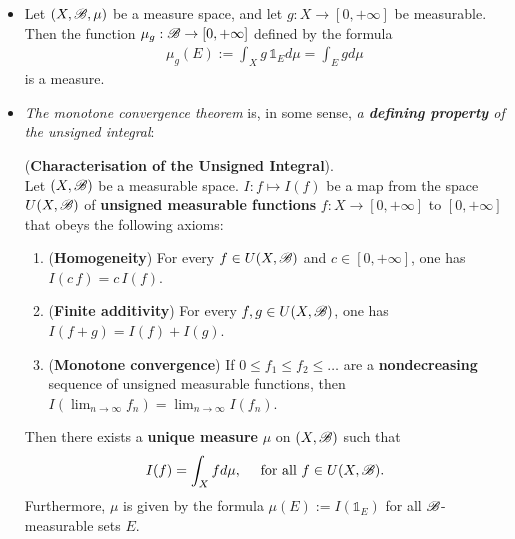 \documentclass[11pt]{article}
\begin{document}
\begin{itemize}
\item \begin{proposition} 
Let $(X, {\mathscr B}, \mu)$ be a measure space, and let $g: X \rightarrow [0, +\infty]$ be measurable. Then the function $\mu_g : {\mathscr B} \rightarrow [0, +\infty]$ defined by the formula
\begin{align*}
\mu_g(E) := \int_X g\,\mathds{1}_{E} d\mu = \int_E g d\mu
\end{align*} is a measure.
\end{proposition}

\item \emph{The monotone convergence theorem} is, in some sense, \emph{a \textbf{defining property} of the unsigned integral}:
\begin{proposition} (\textbf{Characterisation of the Unsigned Integral}). \\
Let $(X, {\mathscr B})$ be a measurable space. $I: f \mapsto I(f)$ be a map from the space $U(X, {\mathscr B})$ of \textbf{unsigned measurable functions} $f: X \rightarrow [0, +\infty]$ to $[0, +\infty]$ that obeys the following axioms:
\begin{enumerate}
\item (\textbf{Homogeneity}) For every $f \in U(X, {\mathscr B})$ and $c \in [0, +\infty]$, one has $I(c\,f) = c\,I(f)$.
\item (\textbf{Finite additivity}) For every $f, g  \in U(X, {\mathscr B})$, one has $I(f + g) = I(f) + I(g)$.
\item (\textbf{Monotone convergence}) If $0 \le f_1 \le f_2 \le \ldots$ are a \textbf{nondecreasing} sequence of unsigned measurable functions, then $I(\lim_{n\rightarrow \infty} f_n) = \lim_{n\rightarrow \infty} I(f_n)$.
\end{enumerate}
Then there exists a \textbf{unique measure} $\mu$ on $(X, {\mathscr B})$ such that 
\begin{align*}
I(f) = \int_X f d\mu, \quad \text{ for all }f \in U(X, {\mathscr B}).
\end{align*}
Furthermore, $\mu$ is given by the formula $\mu(E) := I(\mathds{1}_E)$ for all ${\mathscr B}$-measurable sets $E$.
\end{proposition}
\end{itemize}

\newpage
\end{document}
